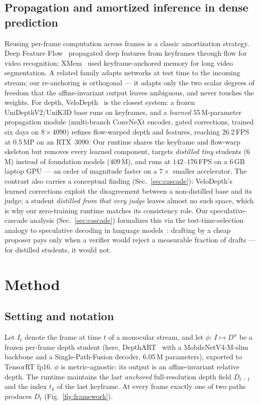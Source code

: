 \documentclass[10pt,twocolumn]{article}
\begin{document}
\subsection{Propagation and amortized inference in dense prediction}
Reusing per-frame computation across frames is a classic amortization
strategy. Deep Feature Flow~\cite{dff} propagated deep features from
keyframes through flow for video recognition; XMem~\cite{xmem} used
keyframe-anchored memory for long video segmentation. A related family
adapts networks at test time to the incoming stream; our re-anchoring is
orthogonal --- it adapts only the two scalar degrees of freedom that the
affine-invariant output leaves ambiguous, and never touches the weights.
For depth,
VeloDepth~\cite{velodepth} is the closest system: a frozen
UniDepthV2/UniK3D base runs on keyframes, and a \emph{learned} 55\,M-parameter
propagation module (multi-branch ConvNeXt encoder, gated corrections, trained
six days on $8\times$4090) refines flow-warped depth and features, reaching
26.2\,FPS at 0.5\,MP on an RTX~3090. Our runtime shares the keyframe and
flow-warp skeleton but removes every learned component, targets
\emph{distilled tiny} students (6\,M) instead of foundation models
($409$\,M), and runs at $142$--$176$\,FPS on a $6$\,GB laptop GPU ---
an order of magnitude faster on a $7\times$ smaller accelerator. The
contrast also carries a conceptual finding (Sec.~\ref{sec:cascade}):
VeloDepth's learned corrections exploit the disagreement between a
non-distilled base and its judge; a student \emph{distilled from that very
judge} leaves almost no such space, which is why our zero-training runtime
matches its consistency role. Our speculative-cascade analysis
(Sec.~\ref{sec:cascade}) formalizes this via the test-time-selection
analogy to speculative decoding in language
models~\cite{specdec}: drafting by a cheap proposer pays only when a
verifier would reject a measurable fraction of drafts --- for distilled
students, it would not.

\section{Method}
\label{sec:method}

\subsection{Setting and notation}
Let $I_t$ denote the frame at time $t$ of a monocular stream, and let
$\phi:\, I \mapsto D^{\phi}$ be a frozen per-frame depth student (here,
DepthART~\cite{depthart} with a MobileNetV4-M-slim backbone and a
Single-Path-Fusion decoder, 6.05\,M parameters), exported to TensorRT fp16.
$\phi$ is metric-agnostic: its output is an affine-invariant relative depth.
The runtime maintains the last \emph{anchored} full-resolution depth field
$D_{t-1}$ and the index $t_k$ of the last keyframe. At every frame exactly one
of two paths produces $D_t$ (Fig.~\ref{fig:framework}).
\end{document}
